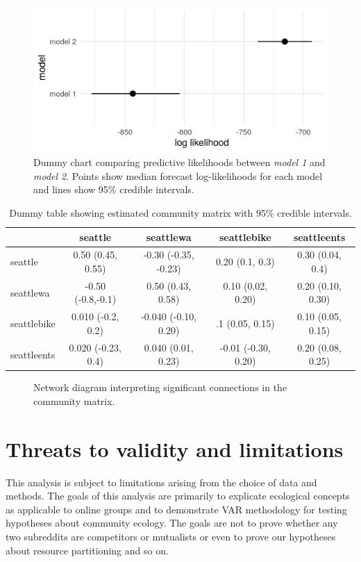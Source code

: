 \documentclass[12pt]{memoir}
\begin{document}
\begin{figure}[h]
  \includegraphics[width=\textwidth]{resources/example_predlik.png}
\caption{Dummy chart comparing predictive likelihoods between \emph{model 1} and \emph{model 2}.  Points show median forecast log-likelihoods for each model and lines show 95\% credible intervals.}
\end{figure}
\begin{table}[h]
\footnotesize
\begin{tabular}{l | c c c c}
  & seattle & seattlewa & seattlebike & seattleents \\ \hline
  seattle & 0.50 (0.45, 0.55) & -0.30 (-0.35, -0.23) & 0.20 (0.1, 0.3) & 0.30 (0.04, 0.4) \\
  seattlewa & -0.50 (-0.8,-0.1) & 0.50 (0.43, 0.58) & 0.10 (0.02, 0.20) & 0.20 (0.10, 0.30) \\
  seattlebike & 0.010 (-0.2, 0.2) & -0.040 (-0.10, 0.20) & .1 (0.05, 0.15) & 0.10 (0.05, 0.15) \\
  seattleents & 0.020 (-0.23, 0.4) & 0.040 (0.01, 0.23) & -0.01 (-0.30, 0.20) & 0.20 (0.08, 0.25) \\ \hline
\end{tabular}
\caption{Dummy table showing estimated community matrix with 95\% credible intervals. }
\end{table}


\begin{figure}[h]
  
  \caption{Network diagram interpreting significant connections in the community matrix.}
\end{figure}

\clearpage
\section{Threats to validity and limitations}

This analysis is subject to limitations arising from the choice of data and methods. The goals of this analysis are primarily to explicate ecological concepts as applicable to online groups and to demonstrate VAR methodology for testing hypotheses about community ecology. The goals are not to prove whether any two subreddits are competitors or mutualists or even to prove our hypotheses about resource partitioning and so on.
\end{document}
